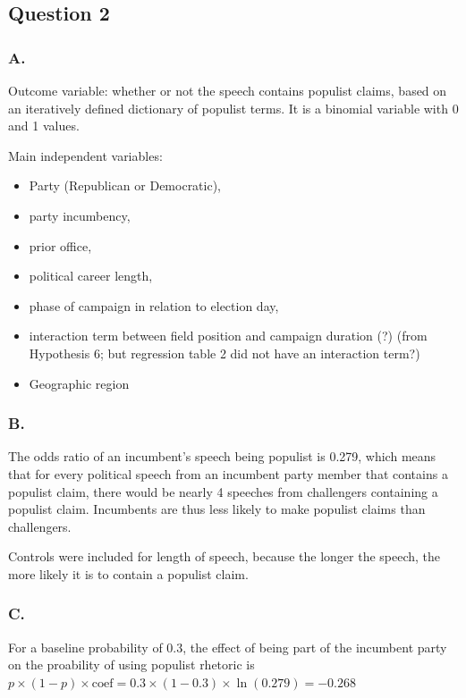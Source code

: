 \documentclass[
  letterpaper,
  DIV=11,
  numbers=noendperiod]{scrartcl}
\providecommand{\tightlist}{%
  \setlength{\itemsep}{0pt}\setlength{\parskip}{0pt}}\usepackage{longtable,booktabs,array}
\begin{document}
\subsection{Question 2}\label{question-2}

\subsubsection{A.}\label{a.-1}

Outcome variable: whether or not the speech contains populist claims,
based on an iteratively defined dictionary of populist terms. It is a
binomial variable with 0 and 1 values.

Main independent variables:

\begin{itemize}
\tightlist
\item
  Party (Republican or Democratic),
\item
  party incumbency,
\item
  prior office,
\item
  political career length,
\item
  phase of campaign in relation to election day,
\item
  interaction term between field position and campaign duration (?)
  (from Hypothesis 6; but regression table 2 did not have an interaction
  term?)
\item
  Geographic region
\end{itemize}

\subsubsection{B.}\label{b.-1}

The odds ratio of an incumbent's speech being populist is 0.279, which
means that for every political speech from an incumbent party member
that contains a populist claim, there would be nearly 4 speeches from
challengers containing a populist claim. Incumbents are thus less likely
to make populist claims than challengers.

Controls were included for length of speech, because the longer the
speech, the more likely it is to contain a populist claim.

\subsubsection{C.}\label{c.-1}

For a baseline probability of 0.3, the effect of being part of the
incumbent party on the proability of using populist rhetoric is
\(p \times (1-p) \times \text{coef} = 0.3 \times (1 - 0.3) \times \ln(0.279) = -0.268\)
\end{document}
